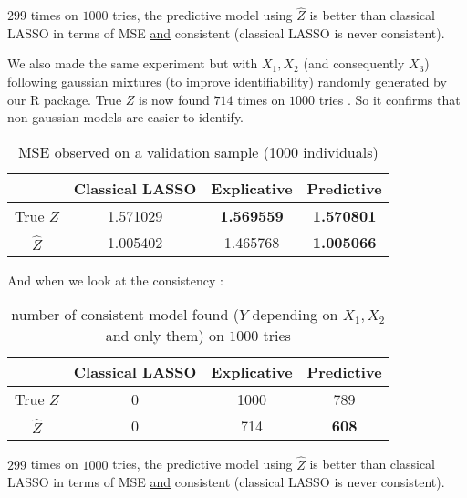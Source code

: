 \documentclass[11pt,a4paper]{article}
\begin{document}
		$299$ times on $1000$ tries, the predictive model using $\hat{Z}$ is better than classical LASSO in terms of MSE \underline{and} consistent (classical LASSO is never consistent).
		
		We also made the same experiment but with $X_1,X_2$ (and consequently $X_3$) following gaussian mixtures (to improve identifiability) randomly generated by our R package. 
		True $Z$ is now found $714$ times on $1000$ tries \label{testidentifiable}. So it confirms that non-gaussian models are easier to identify.
		
		
		\begin{table}[h!]
		\centering
		\begin{tabular}{|c|c|c|c|}
		\hline 
		 & Classical LASSO & Explicative & Predictive \\ 
		\hline 
		True $Z$ &  1.571029 & \textbf{1.569559} & \textbf{1.570801} \\ 
		\hline 
		$\hat{Z}$ & 1.005402 & 1.465768 & \textbf{1.005066} \\ 
		\hline 
		\end{tabular} 
		\caption{MSE observed on a validation sample (1000 individuals)}
		\end{table}

		And when we look at the consistency :
		\begin{table}[h!]
		\centering	
		\begin{tabular}{|c|c|c|c|}
		\hline 
		 & Classical LASSO & Explicative & Predictive \\ 
		\hline 
		True $Z$ &  0 & 1000 & 789 \\ 
		\hline 
		$\hat{Z}$ & 0 & 714 & \textbf{608} \\ 
		\hline 
		\end{tabular} 
		\caption{number of consistent model found ($Y$ depending on $X_1,X_2$ and only them) on $1000$ tries}
		\end{table}				
				
		
		$299$ times on $1000$ tries, the predictive model using $\hat{Z}$ is better than classical LASSO in terms of MSE \underline{and} consistent (classical LASSO is never consistent).
		

	\clearpage	
\end{document}
